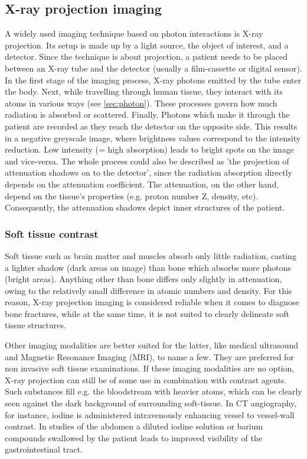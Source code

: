 \subsection{X-ray projection imaging}
A widely used imaging technique based on photon interactions is X-ray projection.
Its setup is made up by a light source, the object of interest, and a detector.
Since the technique is about projection, a patient needs to be placed between an X-ray tube and the detector (usually a film-cassette or digital sensor).
In the first stage of the imaging process, X-ray photons emitted by the tube enter the body.
Next, while travelling through human tissue, they interact with its atoms in various ways (see \ref{sec:photon}).
These processes govern how much radiation is absorbed or scattered.
Finally, Photons which make it through the patient are recorded as they reach the detector on the opposite side.
This results in a negative greyscale image, where brightness values correspond to the intensity reduction.
Low intensity (= high absorption) leads to bright spots on the image and vice-versa.
The whole process could also be described as 'the projection of attenuation shadows on to the detector', since the radiation absorption directly depends on the attenuation coefficient. The attenuation, on the other hand, depend on the tissue's properties (e.g. proton number Z, density, etc).
Consequently, the attenuation shadows depict inner structures of the patient.

\subsubsection{Soft tissue contrast}
\label{sec:soft}
Soft tissue such as brain matter and muscles absorb only little radiation, casting a lighter shadow (dark areas on image) than bone which absorbs more photons (bright areas).
Anything other than bone differs only slightly in attenuation, owing to the relatively small difference in atomic numbers and density.
For this reason, X-ray projection imaging is considered reliable when it comes to diagnose bone fractures, while at the same time, it is not suited to clearly delineate soft tissue structures.
 
Other imaging modalities are better suited for the latter, like medical ultrasound and Magnetic Resonance Imaging (MRI), to name a few.
They are preferred for non invasive soft tissue examinations.
If these imaging modalities are no option, X-ray projection can still be of some use in combination with contrast agents.
Such substances fill e.g. the bloodstream with heavier atoms, which can be clearly seen against the dark background of surrounding soft-tissue.
In CT angiography, for instance, iodine is administered intravenously enhancing vessel to vessel-wall contrast.
In studies of the abdomen a diluted iodine solution or barium compounds swallowed by the patient leads to improved visibility of the gastrointestinal tract.

